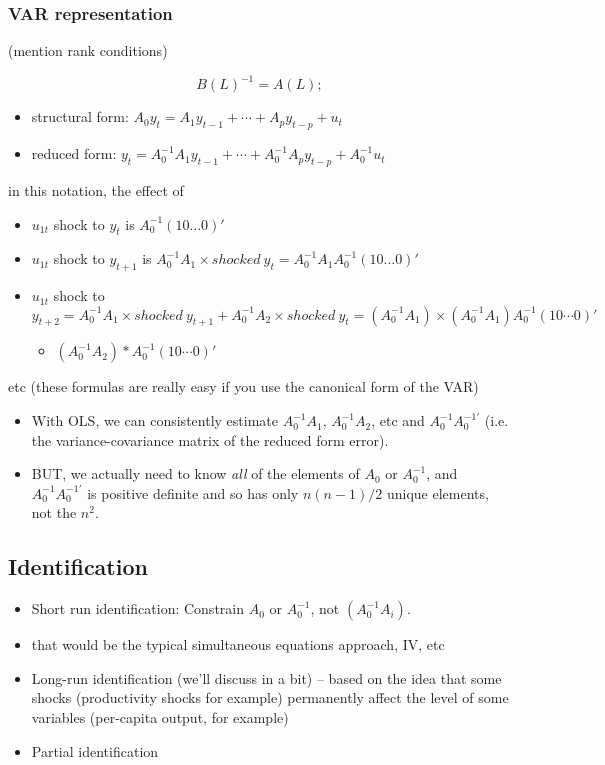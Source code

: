 \subsubsection{VAR representation}

(mention rank conditions)

\[B(L)^{-1} = A(L);\]
\begin{itemize}
\item structural form: $A_0 y_t = A_1 y_{t-1} + \cdots + A_p y_{t-p} + u_t$
\item reduced form: $y_t = A_0^{-1} A_1 y_{t-1} + \cdots + A_0^{-1} A_p
  y_{t-p} + A_0^{-1} u_t$
\end{itemize}
in this notation, the effect of
\begin{itemize}
\item $u_{1t}$ shock to $y_t$ is $A_0^{-1} (1 0 \dots 0)'$
\item $u_{1t}$ shock to $y_{t+1}$ is $A_0^{-1} A_1 × shocked\ y_t =
  A_0^{-1} A_1 A_0^{-1} (1 0 \dots 0)'$
\item $u_{1t}$ shock to $y_{t+2} = A_0^{-1} A_1 × shocked\ y_{t+1} +
  A_0^{-1} A_2 × shocked\ y_t = (A_0^{-1} A_1) × (A_0^{-1} A_1)
  A_0^{-1} (1 0 \cdots 0)'$
  \begin{itemize}
  \item $(A_0^{-1} A_2) * A_0^{-1} (1 0 \cdots 0)'$
  \end{itemize}
\end{itemize}
etc (these formulas are really easy if you use the canonical form of
the VAR)

\begin{itemize}
\item With OLS, we can consistently estimate $A_0^{-1} A_1$, $A_0^{-1}
  A_2$, etc and $A_0^{-1} A_0^{-1\prime}$ (i.e. the variance-covariance
  matrix of the reduced form error).
\item BUT, we actually need to know \emph{all} of the elements of
  $A_0$ or $A_0^{-1}$, and $A_0^{-1} A_0^{-1\prime}$ is positive definite
  and so has only $n (n-1) / 2$ unique elements, not the $n^2$.
\end{itemize}

\subsection{Identification}

\begin{itemize}
\item Short run identification: Constrain $A_0$ or $A_0^{-1}$, not
  $(A_0^{-1} A_i)$.
\item that would be the typical simultaneous equations approach, IV,
  etc
\item Long-run identification (we'll discuss in a bit) -- based on the
  idea that some shocks (productivity shocks for example) permanently
  affect the level of some variables (per-capita output, for example)
\item Partial identification
\end{itemize}

